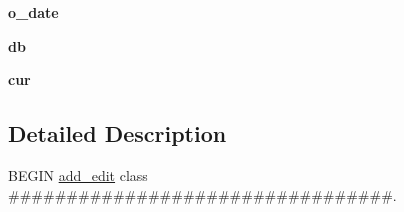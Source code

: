 \begin{DoxyCompactItemize}
\item 
\hypertarget{classadd__edit_1_1add__edit_a449b79bf213f43a7c0a963a376e74efc}{
{\bfseries o\_\-date}}
\label{classadd__edit_1_1add__edit_a449b79bf213f43a7c0a963a376e74efc}

\item 
\hypertarget{classadd__edit_1_1add__edit_a71ed8b6dac44b0325bf57f742a541553}{
{\bfseries db}}
\label{classadd__edit_1_1add__edit_a71ed8b6dac44b0325bf57f742a541553}

\item 
\hypertarget{classadd__edit_1_1add__edit_aeeed74057fa8e1fc4bf4fad430fc2fb8}{
{\bfseries cur}}
\label{classadd__edit_1_1add__edit_aeeed74057fa8e1fc4bf4fad430fc2fb8}

\end{DoxyCompactItemize}


\subsection{Detailed Description}
BEGIN \hyperlink{classadd__edit_1_1add__edit}{add\_\-edit} class \#\#\#\#\#\#\#\#\#\#\#\#\#\#\#\#\#\#\#\#\#\#\#\#\#\#\#\#\#\#\#\#\#. 

